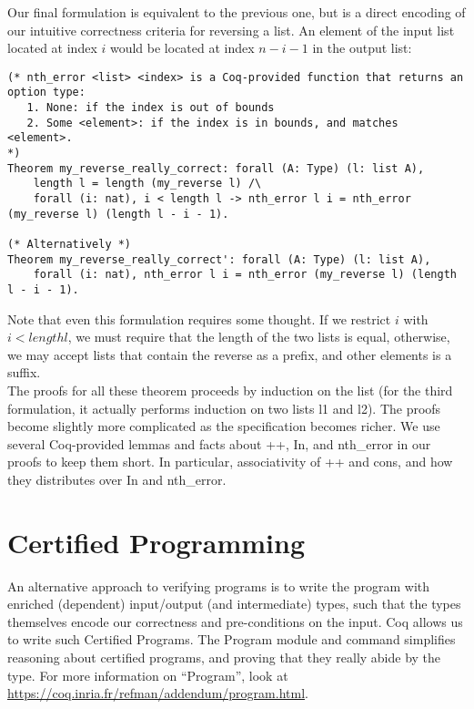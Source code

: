 \documentclass{article}
\begin{document}
Our final formulation is equivalent to the previous one, but is a direct encoding of our intuitive
correctness criteria for reversing a list. An element of the input list located at index $i$ would
be located at index $n - i - 1$ in the output list:
\begin{verbatim}
(* nth_error <list> <index> is a Coq-provided function that returns an option type:
   1. None: if the index is out of bounds
   2. Some <element>: if the index is in bounds, and matches <element>.
*)
Theorem my_reverse_really_correct: forall (A: Type) (l: list A),
    length l = length (my_reverse l) /\
    forall (i: nat), i < length l -> nth_error l i = nth_error (my_reverse l) (length l - i - 1).

(* Alternatively *)
Theorem my_reverse_really_correct': forall (A: Type) (l: list A),
    forall (i: nat), nth_error l i = nth_error (my_reverse l) (length l - i - 1).
\end{verbatim}

Note that even this formulation requires some thought. If we restrict $i$ with $i < length l$, we must require
that the length of the two lists is equal, otherwise, we may accept lists that contain the reverse as a prefix,
and other elements is a suffix. \\

The proofs for all these theorem proceeds by induction on the list (for the third formulation, it actually performs
induction on two lists l1 and l2). The proofs become slightly more complicated as the specification becomes richer.
We use several Coq-provided lemmas and facts about ++, In, and nth\_error in our proofs to keep them short. In particular,
associativity of ++ and cons, and how they distributes over In and nth\_error. \\

\section{Certified Programming}
An alternative approach to verifying programs is to write the program with enriched (dependent) input/output (and intermediate)
types, such that the types themselves encode our correctness and pre-conditions on the input. Coq allows us to write such
Certified Programs. The Program module and command simplifies reasoning about certified programs, and proving that they really abide by the type.
For more information on ``Program'', look at \href{https://coq.inria.fr/refman/addendum/program.html}{https://coq.inria.fr/refman/addendum/program.html}. \\
\end{document}
